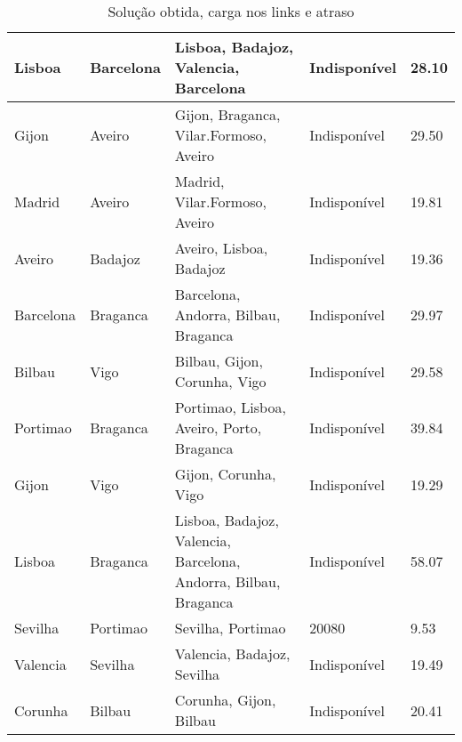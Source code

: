 \begin{table}[!htb]
{\begin{tabular}{|l|l|l|l|l|}
Lisboa & Barcelona & Lisboa, Badajoz, Valencia, Barcelona & Indisponível & 28.10 \\ \hline
Gijon & Aveiro & Gijon, Braganca, Vilar.Formoso, Aveiro & Indisponível & 29.50 \\ \hline
Madrid & Aveiro & Madrid, Vilar.Formoso, Aveiro & Indisponível & 19.81 \\ \hline
Aveiro & Badajoz & Aveiro, Lisboa, Badajoz & Indisponível & 19.36 \\ \hline
Barcelona & Braganca & Barcelona, Andorra, Bilbau, Braganca & Indisponível & 29.97 \\ \hline
Bilbau & Vigo & Bilbau, Gijon, Corunha, Vigo & Indisponível & 29.58 \\ \hline
Portimao & Braganca & Portimao, Lisboa, Aveiro, Porto, Braganca & Indisponível & 39.84 \\ \hline
Gijon & Vigo & Gijon, Corunha, Vigo & Indisponível & 19.29 \\ \hline
Lisboa & Braganca & Lisboa, Badajoz, Valencia, Barcelona, Andorra, Bilbau, Braganca & Indisponível & 58.07 \\ \hline
Sevilha & Portimao & Sevilha, Portimao & 20080 & 9.53 \\ \hline
Valencia & Sevilha & Valencia, Badajoz, Sevilha & Indisponível & 19.49 \\ \hline
Corunha & Bilbau & Corunha, Gijon, Bilbau & Indisponível & 20.41 \\ \hline
\end{tabular}}
\caption[]{Solução obtida, carga nos links e atraso}
\end{table}


